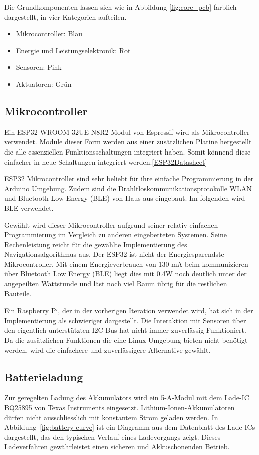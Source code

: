 Die Grundkomponenten lassen sich wie in Abbildung \ref{fig:core_pcb} farblich dargestellt, in vier Kategorien aufteilen.
\begin{itemize}
    \item Mikrocontroller: Blau
    \item Energie und Leistungselektronik: Rot 
    \item Sensoren: Pink
    \item Aktuatoren: Grün 
\end{itemize}


\subsection{Mikrocontroller}

Ein ESP32-WROOM-32UE-N8R2 Modul von Espressif wird als Mikrocontroller verwendet. Module dieser Form werden aus einer zusätzlichen Platine hergestellt die alle essenziellen Funktionsschaltungen integriert haben. Somit könnend diese einfacher in neue Schaltungen integriert werden.\ref{ESP32Datasheet}

ESP32 Mikrocontroller sind sehr beliebt für ihre einfache Programmierung in der Arduino Umgebung. Zudem sind die Drahltloskommunikationsprotokolle WLAN und Bluetooth Low Energy (BLE) von Haus aus eingebaut. Im folgenden wird BLE verwendet.

Gewählt wird dieser Mikrocontroller aufgrund seiner relativ einfachen Programmierung im Vergleich zu anderen eingebetteten Systemen. Seine Rechenleistung reicht für die gewählte Implementierung des Navigationsalgorithmus aus. Der ESP32 ist nicht der Energiesparendste Mikrocontroller. Mit einem Energieverbrauch von 130 mA beim kommunizieren über Bluetooth Low Energy (BLE) liegt dies mit 0.4W noch deutlich unter der angepeilten Wattstunde und läst noch viel Raum übrig für die restlichen Bauteile.

Ein Raspberry Pi, der in der vorherigen Iteration verwendet wird, hat sich in der Implementierung als schwieriger dargestellt. Die Interaktion mit Sensoren über den eigentlich unterstützten I2C Bus hat nicht immer zuverlässig Funktioniert. Da die zusätzlichen Funktionen die eine Linux Umgebung bieten nicht benötigt werden, wird die einfachere und zuverlässigere Alternative gewählt.


\subsection{Batterieladung}
Zur geregelten Ladung des Akkumulators wird ein 5-A-Modul mit dem Lade-IC BQ25895 von Texas Instruments eingesetzt.  
Lithium-Ionen-Akkumulatoren dürfen nicht ausschliesslich mit konstantem Strom geladen werden. In Abbildung~\ref{fig:battery-curve} ist ein Diagramm aus dem Datenblatt des Lade-ICs dargestellt, das den typischen Verlauf eines Ladevorgangs zeigt. Dieses Ladeverfahren gewährleistet einen sicheren und Akkuschonenden Betrieb.

